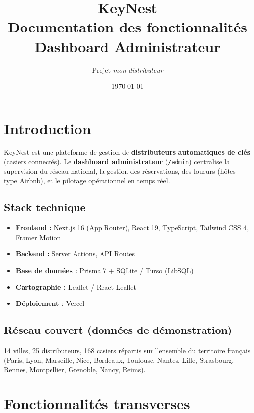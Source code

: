 \documentclass[11pt,a4paper]{article}
\title{
  \vspace{1cm}
  {\Huge\bfseries KeyNest}\\[0.4cm]
  {\Large Documentation des fonctionnalités}\\[0.2cm]
  {\large Dashboard Administrateur}
  \vspace{0.5cm}
}
\author{Projet \textit{mon-distributeur}}
\date{\today}
\begin{document}
\maketitle
\thispagestyle{empty}
\newpage

\tableofcontents
\newpage

\section{Introduction}

KeyNest est une plateforme de gestion de \textbf{distributeurs automatiques de clés} (casiers connectés). Le \textbf{dashboard administrateur} (\texttt{/admin}) centralise la supervision du réseau national, la gestion des réservations, des loueurs (hôtes type Airbnb), et le pilotage opérationnel en temps réel.

\subsection{Stack technique}
\begin{itemize}[noitemsep]
  \item \textbf{Frontend :} Next.js 16 (App Router), React 19, TypeScript, Tailwind CSS 4, Framer Motion
  \item \textbf{Backend :} Server Actions, API Routes
  \item \textbf{Base de données :} Prisma 7 + SQLite / Turso (LibSQL)
  \item \textbf{Cartographie :} Leaflet / React-Leaflet
  \item \textbf{Déploiement :} Vercel
\end{itemize}

\subsection{Réseau couvert (données de démonstration)}
14 villes, 25 distributeurs, 168 casiers répartis sur l'ensemble du territoire français (Paris, Lyon, Marseille, Nice, Bordeaux, Toulouse, Nantes, Lille, Strasbourg, Rennes, Montpellier, Grenoble, Nancy, Reims).

\section{Fonctionnalités transverses}
\end{document}
